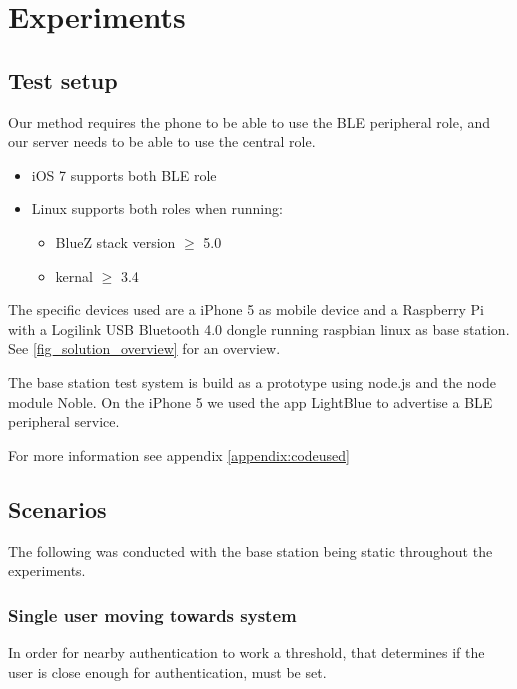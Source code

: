 \section{Experiments}

\subsection{Test setup}

Our method requires the phone to be able to use the BLE peripheral role, and our server needs to be able to use the central role.
\begin{itemize}
	\item iOS 7 supports both BLE role
	\item Linux supports both roles when running:
	\begin{itemize}
		\item BlueZ stack version $\geq$ 5.0
		\item kernal $\geq$ 3.4 
	\end{itemize}
\end{itemize}
%
The specific devices used are a iPhone 5 as mobile device and a Raspberry Pi with a Logilink USB Bluetooth 4.0 dongle running raspbian linux as base station. See \cref{fig_solution_overview} for an overview.

The base station test system is build as a prototype using node.js and the node module Noble.
On the iPhone 5 we used the app LightBlue to advertise a BLE peripheral service.

For more information see appendix \ref{appendix:codeused}

\subsection{Scenarios}

The following was conducted with the base station being static throughout the experiments.


\subsubsection{Single user moving towards system}
\label{section:MovingTowardsSystem}
In order for nearby authentication to work a threshold, that determines if the user is close enough for authentication, must be set.

